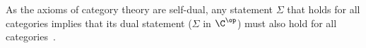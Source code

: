 \begin{remark}
  As the axioms of category theory are self-dual, any statement $\Sigma$ that
  holds for all categories implies that its dual statement ($\Sigma$ in
  $\C^\op$) must also hold for all
  categories~\parencite[p.~16]{leinster:basic_category_theory}.
\end{remark}





